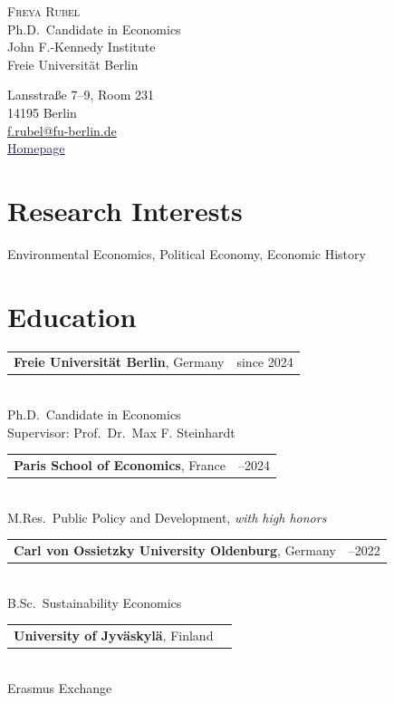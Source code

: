 \documentclass[10pt,a4paper]{article}
\makeatletter
\newlength{\datecolwidth}
\newlength{\contentcolwidth}
\newcommand{\cvitem}[2]{%
  \begin{tabular}{@{} p{\contentcolwidth} >{\raggedleft\arraybackslash}p{\datecolwidth} @{}}
    #2 & #1
  \end{tabular}\\[0.05em]
}
\makeatother
\begin{document}
\singlespacing
\pagestyle{empty}
\begin{minipage}[t]{0.6\textwidth}
  {\Large \textsc{Freya Rubel}} \\[0.3em]
  Ph.D.\ Candidate in Economics \\
  John F.-Kennedy Institute \\
  Freie Universität Berlin
\end{minipage}%
\begin{minipage}[t]{0.4\textwidth}
  \raggedleft 
  Lansstraße 7--9, Room 231 \\ 14195 Berlin \\
  \href{mailto:f.rubel@fu-berlin.de}{f.rubel@fu-berlin.de} \\
  \href{https://sites.google.com/view/freyarubel/}{\textcolor{MidnightBlue}{\underline{Homepage}}}
\end{minipage}

\vspace{1.5em}

\section{\large Research Interests}
Environmental Economics, Political Economy, Economic History \\

\section{\large Education}

\cvitem{since 2024}{\textbf{Freie Universität Berlin}, Germany}
Ph.D.\ Candidate in Economics \\
Supervisor: Prof.\ Dr.\ Max F. Steinhardt \\[0.15cm]
\cvitem{2022--2024}{\textbf{Paris School of Economics}, France}
M.Res.\ Public Policy and Development, \textit{with high honors} \\[0.15cm]
\cvitem{2018--2022}{\textbf{Carl von Ossietzky University Oldenburg}, Germany}
B.Sc.\ Sustainability Economics \\[0.15cm]
\cvitem{2021}{\hspace*{0.5cm} \textbf{University of Jyväskylä}, Finland}
\hspace*{0.5cm} Erasmus Exchange \\[0em]
\end{document}
